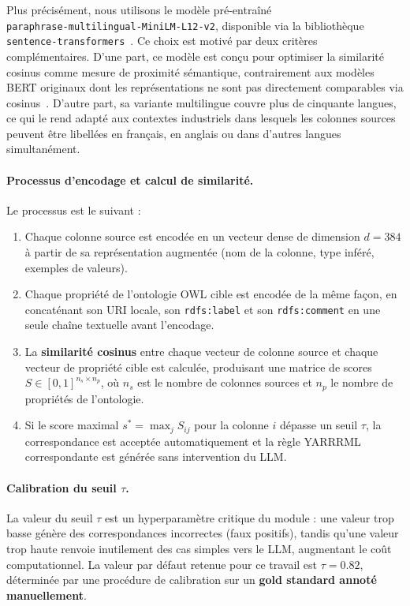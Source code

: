 Plus précisément, nous utilisons le modèle pré-entraîné \\
\texttt{paraphrase-multilingual-MiniLM-L12-v2}, disponible via la
bibliothèque \\ \texttt{sentence-transformers}~\cite{reimers2019sbert}.
Ce choix est motivé par deux critères complémentaires.
D'une part, ce modèle est conçu pour optimiser la similarité cosinus
comme mesure de proximité sémantique, contrairement aux modèles
BERT originaux dont les représentations ne sont pas directement
comparables via cosinus~\cite{reimers2019sbert}.
D'autre part, sa variante multilingue couvre plus de cinquante
langues, ce qui le rend adapté aux contextes industriels dans lesquels
les colonnes sources peuvent être libellées en français, en anglais
ou dans d'autres langues simultanément.

\paragraph{Processus d'encodage et calcul de similarité.}
Le processus est le suivant :
\begin{enumerate}
    \item Chaque colonne source est encodée en un vecteur dense de
          dimension $d = 384$ à partir de sa représentation augmentée
          (nom de la colonne, type inféré, exemples de valeurs).
    \item Chaque propriété de l'ontologie OWL cible est encodée de la
          même façon, en concaténant son URI locale, son
          \texttt{rdfs:label} et son \texttt{rdfs:comment} en une
          seule chaîne textuelle avant l'encodage.
    \item La \textbf{similarité cosinus} entre chaque vecteur de
          colonne source et chaque vecteur de propriété cible est
          calculée, produisant une matrice de scores
          $S \in [0, 1]^{n_s \times n_p}$, où $n_s$ est le nombre de
          colonnes sources et $n_p$ le nombre de propriétés de
          l'ontologie.
    \item Si le score maximal $s^* = \max_j S_{ij}$ pour la
          colonne $i$ dépasse un seuil $\tau$, la correspondance est
          acceptée automatiquement et la règle YARRRML correspondante
          est générée sans intervention du LLM.
\end{enumerate}

\paragraph{Calibration du seuil $\tau$.}
La valeur du seuil $\tau$ est un hyperparamètre critique du module :
une valeur trop basse génère des correspondances incorrectes
(faux positifs), tandis qu'une valeur trop haute renvoie
inutilement des cas simples vers le LLM, augmentant le coût
computationnel. La valeur par défaut retenue pour ce travail est
$\tau = 0.82$, déterminée par une procédure de calibration sur un
\textbf{gold standard annoté manuellement}.

